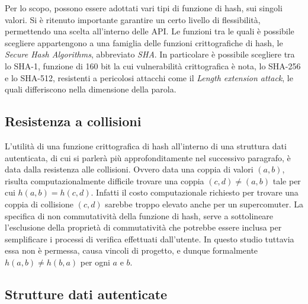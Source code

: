 			Per lo scopo, possono essere adottati vari tipi di funzione di hash, sui singoli valori. Si è ritenuto importante garantire un certo livello di flessibilità, permettendo una scelta all'interno delle API. Le funzioni tra le quali è possibile scegliere appartengono a una famiglia delle funzioni crittografiche di hash, le \textit{Secure Hash Algorithms}, abbreviato \textit{SHA}. In particolare è possibile scegliere tra lo SHA-1, funzione di 160 bit la cui vulnerabilità crittografica è nota, lo SHA-256 e lo SHA-512, resistenti a pericolosi attacchi come il \textit{Length extension attack}, le quali differiscono nella dimensione della parola.
			
	\subsection{Resistenza a collisioni}
	

		L'utilità di una funzione crittografica di hash all'interno di una struttura dati autenticata, di cui si parlerà più approfonditamente nel successivo paragrafo, è data dalla resistenza alle collisioni. Ovvero data una coppia di valori $ (a,b) $, risulta computazionalmente difficile trovare una coppia $ (c,d) \ne (a,b) $ tale per cui  $ h(a,b) = h(c,d) $. Infatti il costo computazionale richiesto per trovare una coppia di collisione $ (c,d) $ sarebbe troppo elevato anche per un supercomuter.
		La specifica di non commutatività della funzione di hash, serve a sottolineare l'esclusione della proprietà di commutatività che potrebbe essere inclusa per semplificare i processi di verifica effettuati dall'utente.
		In questo studio tuttavia essa non è permessa, causa vincoli di progetto, e dunque formalmente $ h(a,b) \ne h(b,a) $ per ogni $ a $ e $ b $.

	\subsection{Strutture dati autenticate}


